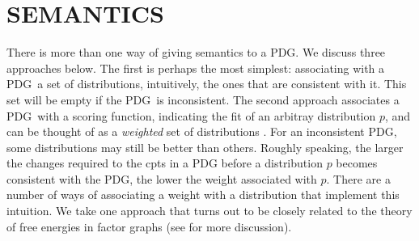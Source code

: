 \documentclass{article}
\newcommand{\modelname}{probabilistic dependency graph}
\newcommand{\modelnames}{\modelname s}
\newcommand{\MN}{PDG}
\newcommand{\MNs}{\MN s}
\numberwithin{equation}{section}
\begin{document}
	\section{SEMANTICS}\label{sec:semantics}
	There is more than one way of giving semantics to a \MN.  We discuss three approaches below.
	The first is perhaps the most simplest: associating with a \MN\ a set of distributions, intuitively, the ones that are consistent with it.	This set will be empty if the \MN\ is inconsistent.
	The second approach associates a \MN\ with a scoring function, indicating the fit of an arbitray distribution $p$, and can be thought of as a \emph{weighted} set of distributions \parencite[cf.][]{halpern2015weighted}.  For an inconsistent \MN, some distributions may still be better than others.
	Roughly speaking, the larger the changes required to the cpts in a PDG before a distribution $p$ becomes consistent with the PDG, the lower the weight associated with $p$.  There are a number of ways of associating a weight with a distribution that implement this intuition.  We take one approach that turns out to be closely related to the theory of free energies in factor graphs (see  for more discussion).
\end{document}
